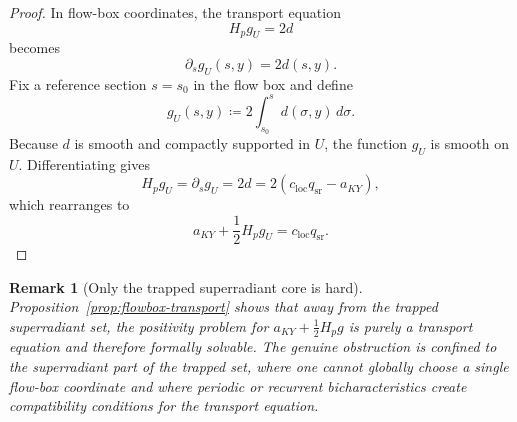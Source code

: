 \documentclass[12pt,a4paper]{article}
\newtheorem{remark}[theorem]{Remark}
\begin{document}
\begin{proof}
In flow-box coordinates, the transport equation
\begin{equation}
H_p g_U = 2d
\end{equation}
becomes
\begin{equation}
\partial_s g_U(s,y) = 2d(s,y).
\end{equation}
Fix a reference section $s=s_0$ in the flow box and define
\begin{equation}
g_U(s,y) \coloneqq 2 \int_{s_0}^{s} d(\sigma,y)\, d\sigma.
\end{equation}
Because $d$ is smooth and compactly supported in $U$, the function $g_U$ is smooth on $U$. Differentiating gives
\begin{equation}
H_p g_U = \partial_s g_U = 2d = 2(c_{\mathrm{loc}} q_{\mathrm{sr}} - a_{KY}),
\end{equation}
which rearranges to
\begin{equation}
a_{KY} + \frac12 H_p g_U = c_{\mathrm{loc}} q_{\mathrm{sr}}.
\end{equation}
\end{proof}

\begin{remark}[Only the trapped superradiant core is hard]
Proposition~\ref{prop:flowbox-transport} shows that away from the trapped superradiant set, the positivity problem for $a_{KY} + \frac12 H_p g$ is purely a transport equation and therefore formally solvable. The genuine obstruction is confined to the superradiant part of the trapped set, where one cannot globally choose a single flow-box coordinate and where periodic or recurrent bicharacteristics create compatibility conditions for the transport equation.
\end{remark}
\end{document}
